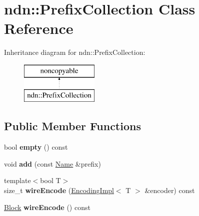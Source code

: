 \hypertarget{classndn_1_1PrefixCollection}{}\section{ndn\+:\+:Prefix\+Collection Class Reference}
\label{classndn_1_1PrefixCollection}
Inheritance diagram for ndn\+:\+:Prefix\+Collection\+:\begin{figure}[H]
\begin{center}
\leavevmode
\includegraphics[height=2.000000cm]{classndn_1_1PrefixCollection}
\end{center}
\end{figure}
\subsection*{Public Member Functions}
\begin{DoxyCompactItemize}
\item 
bool {\bfseries empty} () const\hypertarget{classndn_1_1PrefixCollection_a36d9bc9da35d1fbb8ab158d9581e55a4}{}\label{classndn_1_1PrefixCollection_a36d9bc9da35d1fbb8ab158d9581e55a4}

\item 
void {\bfseries add} (const \hyperlink{classndn_1_1Name}{Name} \&prefix)\hypertarget{classndn_1_1PrefixCollection_a19d743ca046c46d2d16a4b157991e1eb}{}\label{classndn_1_1PrefixCollection_a19d743ca046c46d2d16a4b157991e1eb}

\item 
{\footnotesize template$<$bool T$>$ }\\size\+\_\+t {\bfseries wire\+Encode} (\hyperlink{classndn_1_1encoding_1_1EncodingImpl}{Encoding\+Impl}$<$ T $>$ \&encoder) const\hypertarget{classndn_1_1PrefixCollection_a964072596792890649f691c4d86fb5dc}{}\label{classndn_1_1PrefixCollection_a964072596792890649f691c4d86fb5dc}

\item 
\hyperlink{classndn_1_1Block}{Block} {\bfseries wire\+Encode} () const\hypertarget{classndn_1_1PrefixCollection_afc3cceffab66e8dbb76617015a9a51a1}{}\label{classndn_1_1PrefixCollection_afc3cceffab66e8dbb76617015a9a51a1}

\end{DoxyCompactItemize}


